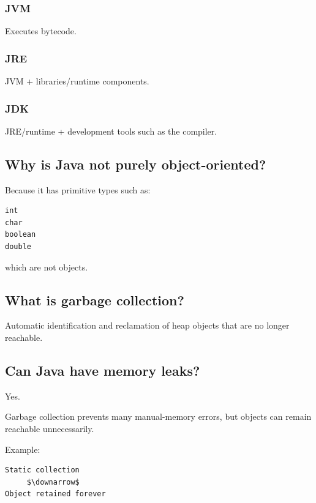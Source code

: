 \subsubsection{JVM}

Executes bytecode.

\subsubsection{JRE}

JVM + libraries/runtime components.

\subsubsection{JDK}

JRE/runtime + development tools such as the compiler.

\medskip

\subsection{Why is Java not purely object-oriented?}

Because it has primitive types such as:

\begin{lstlisting}
int
char
boolean
double
\end{lstlisting}

which are not objects.

\medskip

\subsection{What is garbage collection?}

Automatic identification and reclamation of heap objects that are no longer reachable.

\medskip

\subsection{Can Java have memory leaks?}

Yes.

Garbage collection prevents many manual-memory errors, but objects can remain reachable unnecessarily.

Example:

\begin{lstlisting}
Static collection
     $\downarrow$
Object retained forever
\end{lstlisting}

